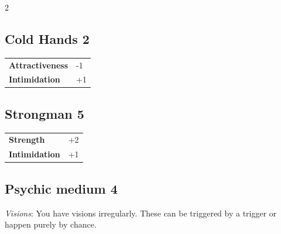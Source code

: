 \begin{multicols}{2}
\begin{tcolorbox}

\end{tcolorbox}

\begin{tcolorbox}
    \subsection*{Cold Hands \hfill \small{2 }}
    \tcblower




\begin{tabular}{@{}ll@{}}
    \textbf{Attractiveness} & -1\\
    \textbf{Intimidation} & +1\\
\end{tabular}


\end{tcolorbox}

\begin{tcolorbox}
    \subsection*{Strongman \hfill \small{5 }}
    \tcblower




\begin{tabular}{@{}ll@{}}
    \textbf{Strength} & +2\\
    \textbf{Intimidation} & +1\\
\end{tabular}


\end{tcolorbox}

\begin{tcolorbox}
    \subsection*{Psychic medium \hfill \small{4 }}
    \tcblower
\textit{Visions}: You have visions irregularly. These can be triggered by a trigger or happen purely by chance.



\end{tcolorbox}
\end{multicols}
